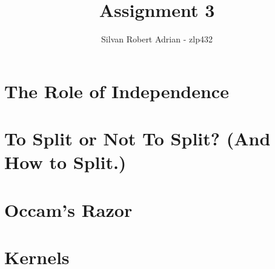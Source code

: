 \documentclass[a4paper]{article}
\title{\vspace{-5cm} Assignment 3}
\author{Silvan Robert Adrian - zlp432}
\begin{document}
\maketitle

\tableofcontents

\section{The Role of Independence}


\section{To Split or Not To Split? (And How to Split.)}


\section{Occam's Razor}


\section{Kernels}

\end{document}
